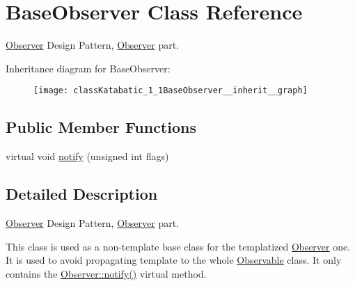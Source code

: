 \hypertarget{classKatabatic_1_1BaseObserver}{\section{Base\-Observer Class Reference}
\label{classKatabatic_1_1BaseObserver}
}


\hyperlink{classKatabatic_1_1Observer}{Observer} Design Pattern, \hyperlink{classKatabatic_1_1Observer}{Observer} part.  




Inheritance diagram for Base\-Observer\-:\nopagebreak
\begin{figure}[H]
\begin{center}
\leavevmode
\texttt{[image: classKatabatic\_1\_1BaseObserver\_\_inherit\_\_graph]}
\end{center}
\end{figure}
\subsection*{Public Member Functions}
\begin{DoxyCompactItemize}
\item 
virtual void \hyperlink{classKatabatic_1_1BaseObserver_a52e577fb0c4f2e3650928334fb621c2f}{notify} (unsigned int flags)
\end{DoxyCompactItemize}


\subsection{Detailed Description}
\hyperlink{classKatabatic_1_1Observer}{Observer} Design Pattern, \hyperlink{classKatabatic_1_1Observer}{Observer} part. 

This class is used as a non-\/template base class for the templatized \hyperlink{classKatabatic_1_1Observer}{Observer} one. It is used to avoid propagating template to the whole \hyperlink{classKatabatic_1_1Observable}{Observable} class. It only contains the \hyperlink{classKatabatic_1_1BaseObserver_a52e577fb0c4f2e3650928334fb621c2f}{Observer\-::notify()} virtual method. 

